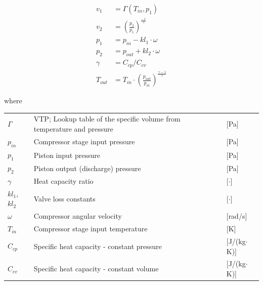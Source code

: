 \begin{align}
	v_1 &= \Gamma(T_{in},p_{1}) \\
	v_2 &= \left(\frac{p_2}{p_1}\right)^{\frac{-1}{\gamma}} \\
	p_1 &= p_{in} - kl_1 \cdot \omega \\
	p_2 &= p_{out} + kl_2 \cdot \omega \\
	\gamma &= C_{cp}/C_{cv} \\
	T_{out} &= T_{in}\cdot \left(\frac{p_{out}}{p_{in}}\right)^{\frac{\gamma-1}{\gamma}}
\end{align}

where

\begin{center}
	\begin{tabular}{l p{8cm} l}
		$\Gamma$				& VTP; Lookup table of the specific volume from temperature and pressure		& [\si{Pa}]\\
		$p_{in}$				& Compressor stage input pressure 			& [\si{Pa}]\\
		$p_1$					& Piston input pressure									& [\si{Pa}]\\
		$p_2$					& Piston output (discharge) pressure 		& [\si{Pa}]\\
		$\gamma$				& Heat capacity ratio 								& [$ \cdot $]\\
		$ kl_1$, $kl_2$			& Valve loss constants							& [$ \cdot $]\\
		$\omega$ 				& Compressor angular velocity 				& [\si{rad}/\si{s}]\\
		$T_{in}$ 				& Compressor stage input temperature 	& [\si{K}]\\
		$C_{cp}$ 				& Specific heat capacity - constant pressure 	& [\si{J}/(\si{kg}$ \cdot $\si{K})]\\
		$C_{cv} $ 				& Specific heat capacity - constant volume 	& [\si{J}/(\si{kg}$ \cdot $\si{K})]\\
	\end{tabular}
\end{center}


